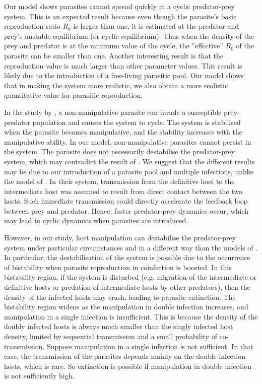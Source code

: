\documentclass[11pt]{article}
\begin{document}
Our model shows parasites cannot spread quickly in a cyclic predator-prey system. 
This is an expected result because even though the parasite's basic reproduction ratio $R_0$ is larger than one, it is estimated at the predator and prey's unstable equilibrium (or cyclic equilibrium). 
Thus when the density of the prey and predator is at the minimum value of the cycle, the ''effective'' $R_0$ of the parasite can be smaller than one. 
Another interesting result is that the reproduction value is much larger than other parameter values.
This result is likely due to the introduction of a free-living parasitic pool. Our model shows that in making the system more realistic, we also obtain a more realistic quantitative value for parasitic reproduction.


In the study by \cite{Rogawa2018}, a non-manipulative parasite can invade a susceptible prey-predator population and causes the system to cycle. 
The system is stabilised when the parasite becomes manipulative, and the stability increases with the manipulative ability.
In our model, non-manipulative parasites cannot persist in the system. The parasite does not necessarily destabilise the predator-prey system, which may contradict the result of \cite{Rogawa2018}. 
We suggest that the different results may be due to our introduction of a parasite pool and multiple infections, unlike the model of \cite{Rogawa2018}. 
In their system, transmission from the definitive host to the intermediate host was assumed to result from direct contact between the two hosts. 
Such immediate transmission could directly accelerate the feedback loop between prey and predator. 
Hence, faster predator-prey dynamics occur, which may lead to cyclic dynamics when parasites are introduced.

However, in our study, host manipulation can destabilise the predator-prey system under particular circumstances and in a different way than the models of \cite{Rogawa2018}. 
In particular, the destabilisation of the system is possible due to the occurrence of bistability when parasite reproduction in coinfection is boosted. 
In this bistability region, if the system is disturbed (e.g. migration of the intermediate or definitive hosts or predation of intermediate hosts by other predators), then the density of the infected hosts may crash, leading to parasite extinction. 
The bistability region widens as the manipulation in double infection increases, and manipulation in a single infection is insufficient. 
This is because the density of the doubly infected hosts is always much smaller than the singly infected host density, limited by sequential transmission and a small probability of co-transmission. 
Suppose manipulation in a single infection is not sufficient. 
In that case, the transmission of the parasites depends mainly on the double infection hosts, which is rare. 
So extinction is possible if manipulation in double infection is not sufficiently high.
\end{document}
